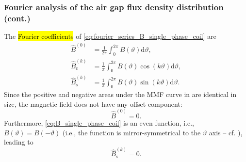 \begin{frame}
	\frametitle{Fourier analysis of the air gap flux density distribution (cont.)}
	The \hl{Fourier coefficients} of \eqref{eq:fourier_series_B_single_phase_coil} are
	\begin{equation}
		\begin{split}
			\hat{B}^{(0)}              & = \frac{1}{2\pi} \int_{0}^{2\pi} B(\vartheta) \mathrm{d}\vartheta,                   \\
			\hat{B}_{\mathrm{c}}^{(k)} & = \frac{1}{\pi} \int_{0}^{2 \pi} B(\vartheta) \cos(k \vartheta) \mathrm{d}\vartheta, \\
			\hat{B}_{\mathrm{s}}^{(k)} & = \frac{1}{\pi} \int_{0}^{2\pi} B(\vartheta) \sin(k \vartheta) \mathrm{d}\vartheta.
		\end{split}
	\end{equation}
	\pause
	Since the positive and negative areas under the MMF curve in  are identical in size, the magnetic field does not have any offset component:
	$$\hat{B}^{(0)} = 0.$$ \pause Furthermore, \eqref{eq:B_single_phase_coil} is an even function, i.e., $B(\vartheta)=B(-\vartheta)$ (i.e., the function is mirror-symmetrical to the $\vartheta$ axis -- cf. ), leading to $$\hat{B}_{\mathrm{s}}^{(k)} = 0.$$
\end{frame}

